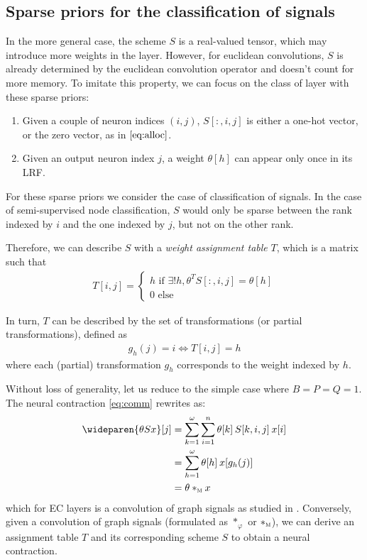\subsection{Sparse priors for the classification of signals}
\label{sec:sparse}

In the more general case, the scheme $S$ is a real-valued tensor, which may introduce more weights in the layer. However, for euclidean convolutions, $S$ is already determined by the euclidean convolution operator and doesn't count for more memory. To imitate this property, we can focus on the class of layer with these sparse priors:
\begin{enumerate}
  \item Given a couple of neuron indices $(i,j)$, $S[:,i,j]$ is either a one-hot vector, or the zero vector, as in $\eqref{eq:alloc}$.
  \item Given an output neuron index $j$, a weight $\theta[h]$ can appear only once in its LRF.
\end{enumerate}

\begin{remark}
For these sparse priors we consider the case of classification of signals. In the case of semi-supervised node classification, $S$ would only be sparse between the rank indexed by $i$ and the one indexed by $j$, but not on the other rank.
\end{remark}

Therefore, we can describe $S$ with a \emph{weight assignment table} $T$, which is a matrix such that
\begin{gather}
T[i,j] = \begin{cases}h \text{ if } \exists! h, \theta^T S[:,i,j] = \theta[h]\\ 0 \text{ else}\end{cases}
\end{gather}

In turn, $T$ can be described by the set of transformations (or partial transformations), defined as
\begin{gather}
g_h(j) = i \Leftrightarrow T[i,j] = h
\end{gather}
where each (partial) transformation $g_h$ corresponds to the weight indexed by $h$.

Without loss of generality, let us reduce to the simple case where $B=P=Q=1$. The neural contraction \eqref{eq:comm} rewrites as:
\begin{align}
\wideparen{\theta Sx}[j] & = \displaystyle \sum_{k=1}^\omega \sum_{i=1}^n \theta[k] \h{2} S[k,i,j] \h{2} x[i]\\
                         & = \displaystyle \sum_{h=1}^\omega \theta[h] \h{2} x[g_h(j)]\\
                         & = \theta \ast_{\M} x
\end{align}
which for EC layers is a convolution of graph signals as studied in . Conversely, given a convolution of graph signals (formulated as $\ast_\varphi$ or $\ast_{\operatorname{\textsc{m}}}$), we can derive an assignment table $T$ and its corresponding scheme $S$ to obtain a neural contraction.

